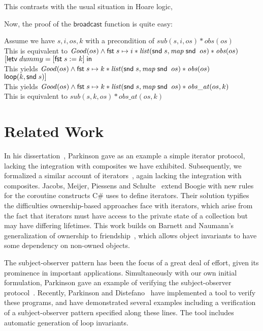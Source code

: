 This contrasts with the usual situation in Hoare logic, 




Now, the proof of the $\mathsf{broadcast}$ function is quite easy: 

\begin{tabbedproof}
\oo Assume we have $s, i, os, k$ with a precondition of $\mathit{sub}(s, i, os) * \mathit{obs}(os)$ \\
\oo This is equivalent to $\mathit{Good}(os) \land \mathsf{fst}\; s\mapsto i * \mathit{list}(\mathsf{snd}\; s, \mathit{map}\;\mathsf{snd}\;\;os) * \mathit{obs}(os)$ \\
\oo $[\mathsf{letv}\;dummy = [\mathsf{fst}\; s := k]\;\mathsf{in}\;$ \\
\oo This yields $\mathit{Good}(os) \land \mathsf{fst}\; s\mapsto k * \mathit{list}(\mathsf{snd}\; s, \mathit{map}\;\mathsf{snd}\;\;os) * \mathit{obs}(os)$ \\
\oo $\mathsf{loop}(k, \mathsf{snd}\; s)]$ \\
\oo This yields $\mathit{Good}(os) \land \mathsf{fst}\; s\mapsto k * \mathit{list}(\mathsf{snd}\; s, \mathit{map}\;\mathsf{snd}\;\;os) * \mathit{obs\_at}(os, k)$ \\
\oo This is equivalent to $\mathit{sub}(s, k, os) * \mathit{obs\_at}(os,k)$ 
\end{tabbedproof}

% 

\section{Related Work}

In his dissertation~\cite{parkinson-thesis}, Parkinson gave as an
example a simple iterator protocol, lacking the integration with
composites we have exhibited.  Subsequently, we formalized a similar
account of iterators~\cite{iterator}, again lacking the integration
with composites. Jacobs, Meijer, Piessens and
Schulte~\cite{iterators-revisited} extend Boogie with new rules for
the coroutine constructs C\# uses to define iterators. Their solution
typifies the difficulties ownership-based approaches face with
iterators, which arise from the fact that iterators must have access
to the private state of a collection but may have differing
lifetimes. This work builds on Barnett and Naumann's generalization of
ownership to friendship~\cite{friends}, which allows object invariants
to have some dependency on non-owned objects.

The subject-observer pattern has been the focus of a great deal of effort,
given its prominence in important applications. Simultaneously with our own
initial formulation, Parkinson gave an example of verifying the
subject-observer protocol~\cite{parkinson-iwaco-07}. Recently, Parkinson and
Distefano~\cite{jstar-parkinson-distefano} have implemented a tool to verify
these programs, and have demonstrated several examples including a verification
of a subject-observer pattern specified along these lines. The tool includes
automatic generation of loop invariants. 

